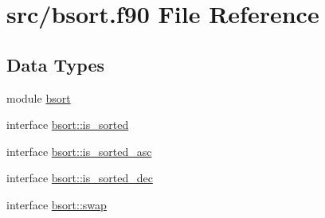 \hypertarget{bsort_8f90}{\section{src/bsort.f90 File Reference}
\label{bsort_8f90}
}
\subsection*{Data Types}
\begin{DoxyCompactItemize}
\item 
module \hyperlink{classbsort}{bsort}
\item 
interface \hyperlink{interfacebsort_1_1is__sorted}{bsort\-::is\-\_\-sorted}
\item 
interface \hyperlink{interfacebsort_1_1is__sorted__asc}{bsort\-::is\-\_\-sorted\-\_\-asc}
\item 
interface \hyperlink{interfacebsort_1_1is__sorted__dec}{bsort\-::is\-\_\-sorted\-\_\-dec}
\item 
interface \hyperlink{interfacebsort_1_1swap}{bsort\-::swap}
\end{DoxyCompactItemize}
